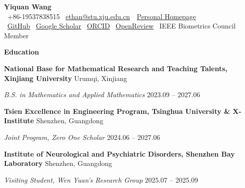 \documentclass[11pt]{article}
\begin{document}
	\begin{center}
		\textbf{\Large Yiquan Wang}\\
		\textbullet \ +86-19537838515 \textbullet \ \href{mailto:ethan@stu.xju.edu.cn}{ethan@stu.xju.edu.cn}\ \textbullet \ \href{https://wyqmath.cn/en.html}{Personal Homepage} \\
		\textbullet \ \href{https://github.com/wyqmath}{GitHub} \textbullet \ \href{https://scholar.google.com/citations?user=ULP3e1cAAAAJ}{Google Scholar} \textbullet \ \href{https://orcid.org/0000-0003-1417-5752}{ORCID} \textbullet \ \href{https://openreview.net/profile?id=~Yiquan_Wang3}{OpenReview} \textbullet \ IEEE Biometrics Council Member \\
		\hrulefill
	\end{center}
	
	\vspace{2pt}
	
	\begin{center}
		\textbf{\large Education}
	\end{center}
	\textbf{National Base for Mathematical Research and Teaching Talents, Xinjiang University} \hfill Urumqi, Xinjiang
	
	\textit{B.S. in Mathematics and Applied Mathematics} \hfill 2023.09 – 2027.06
	
	\vspace{10pt}
	
	\textbf{Tsien Excellence in Engineering Program, Tsinghua University \& X-Institute} \hfill Shenzhen, Guangdong
	
	\textit{Joint Program, Zero One Scholar} \hfill 2024.06 – 2027.06
	
	\vspace{10pt}
	
	\textbf{Institute of Neurological and Psychiatric Disorders, Shenzhen Bay Laboratory} \hfill Shenzhen, Guangdong
	
	\textit{Visiting Student, Wen Yuan's Research Group} \hfill 2025.07 – 2025.09
	
	\vspace{12pt}
	
\end{document}
